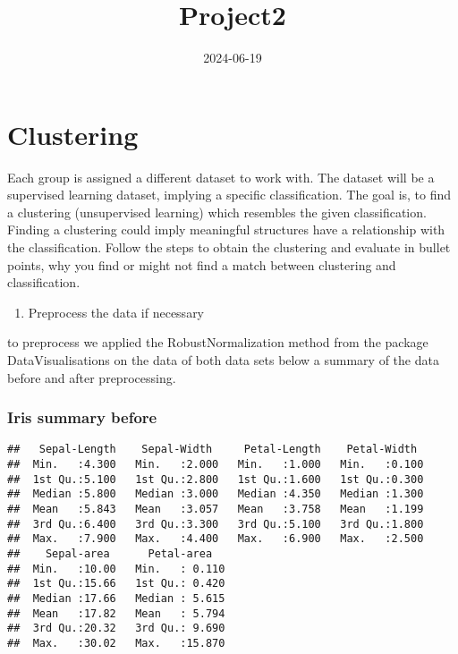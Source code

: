 \documentclass[
]{article}
\title{Project2}
\author{}
\date{\vspace{-2.5em}2024-06-19}
\providecommand{\tightlist}{%
  \setlength{\itemsep}{0pt}\setlength{\parskip}{0pt}}
\begin{document}
\maketitle

\section{Clustering}\label{clustering}

Each group is assigned a different dataset to work with. The dataset
will be a supervised learning dataset, implying a specific
classification. The goal is, to find a clustering (unsupervised
learning) which resembles the given classification. Finding a clustering
could imply meaningful structures have a relationship with the
classification. Follow the steps to obtain the clustering and evaluate
in bullet points, why you find or might not find a match between
clustering and classification.

\begin{enumerate}
\def\labelenumi{\arabic{enumi}.}
\tightlist
\item
  Preprocess the data if necessary
\end{enumerate}

to preprocess we applied the RobustNormalization method from the package
DataVisualisations on the data of both data sets below a summary of the
data before and after preprocessing.

\subsubsection{Iris summary before}\label{iris-summary-before}

\begin{verbatim}
##   Sepal-Length    Sepal-Width     Petal-Length    Petal-Width   
##  Min.   :4.300   Min.   :2.000   Min.   :1.000   Min.   :0.100  
##  1st Qu.:5.100   1st Qu.:2.800   1st Qu.:1.600   1st Qu.:0.300  
##  Median :5.800   Median :3.000   Median :4.350   Median :1.300  
##  Mean   :5.843   Mean   :3.057   Mean   :3.758   Mean   :1.199  
##  3rd Qu.:6.400   3rd Qu.:3.300   3rd Qu.:5.100   3rd Qu.:1.800  
##  Max.   :7.900   Max.   :4.400   Max.   :6.900   Max.   :2.500  
##    Sepal-area      Petal-area    
##  Min.   :10.00   Min.   : 0.110  
##  1st Qu.:15.66   1st Qu.: 0.420  
##  Median :17.66   Median : 5.615  
##  Mean   :17.82   Mean   : 5.794  
##  3rd Qu.:20.32   3rd Qu.: 9.690  
##  Max.   :30.02   Max.   :15.870
\end{verbatim}
\end{document}
